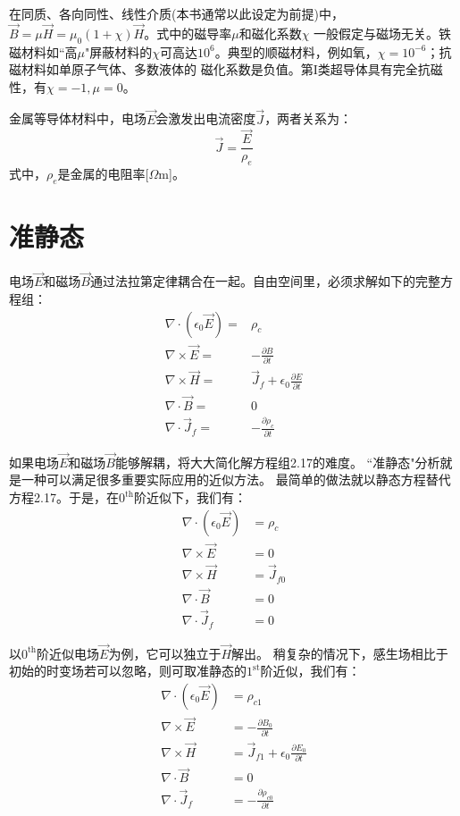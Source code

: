 在同质、各向同性、线性介质(本书通常以此设定为前提)中，$\vec{B}=\mu \vec{H}=\mu_0(1+\chi)\vec{H}$。式中的磁导率$\mu$和磁化系数$\chi$
一般假定与磁场无关。铁磁材料如``高$\mu$"屏蔽材料的$\chi$可高达$10^6$。典型的顺磁材料，例如氧，$\chi=10^{-6}$；抗磁材料如单原子气体、多数液体的
磁化系数是负值。第I类超导体具有完全抗磁性，有$\chi=-1, \mu=0$。

金属等导体材料中，电场$\vec{E}$会激发出电流密度$\vec{J}$，两者关系为：
\begin{equation}
  \vec{J}=\frac{\vec{E}}{\rho_e}
\end{equation}
式中，$\rho_e$是金属的电阻率[$\Omega$m]。

\section{准静态}
电场$\vec{E}$和磁场$\vec{B}$通过法拉第定律耦合在一起。自由空间里，必须求解如下的完整方程组：
\begin{subequations}
	\begin{align}
\nabla \cdot (\epsilon_0\vec{E})=&\rho_c \\
\nabla \times \vec{E} =&-\frac{\partial{B}}{\partial{t}} \\
\nabla \times \vec{H} =&\vec{J}_f+\epsilon_0 \frac{\partial{E}}{\partial{t}}  \\
\nabla \cdot \vec{B} =&0  \\
\nabla \cdot \vec{J}_f =&-\frac{\partial{\rho_{c}}}{\partial{t}}
	\end{align}
\end{subequations}

如果电场$\vec{E}$和磁场$\vec{B}$能够解耦，将大大简化解方程组2.17的难度。
``准静态"分析就是一种可以满足很多重要实际应用的近似方法。
最简单的做法就以静态方程替代方程2.17。于是，在$\mathrm{0^{th}}$阶近似下，我们有：
\begin{subequations}
	\begin{align}
\nabla \cdot (\epsilon_0\vec{E}) &=\rho_c \\
\nabla \times \vec{E} &=0  \\
\nabla \times \vec{H} &=\vec{J}_{f0}  \\
\nabla \cdot \vec{B} &=0  \\
\nabla \cdot \vec{J}_f &=0
	\end{align}
\end{subequations}

以$\mathrm{0^{th}}$阶近似电场$\vec{E}$为例，它可以独立于$\vec{H}$解出。
稍复杂的情况下，感生场相比于初始的时变场若可以忽略，则可取准静态的$\mathrm{1^{st}}$阶近似，我们有：
\begin{subequations}
	\begin{align}
\nabla \cdot (\epsilon_0\vec{E}) &=\rho_{c1} \\
\nabla \times \vec{E} &=-\frac{\partial{B_0}}{\partial{t}} \\
\nabla \times \vec{H} &=\vec{J}_{f1}+\epsilon_0 \frac{\partial{E_0}}{\partial{t}}  \\
\nabla \cdot \vec{B} &=0 \\
\nabla \cdot \vec{J}_f &=-\frac{\partial{\rho_{c0}}}{\partial{t}}
	\end{align}
\end{subequations}

